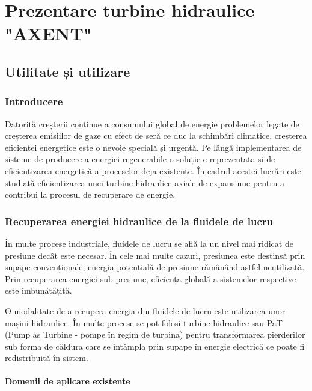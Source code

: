 \chapter{Prezentare turbine hidraulice "AXENT"}\label{chapter:prezentare}


\section{Utilitate și utilizare}

\subsection{Introducere}

Datorită creșterii continue a consumului global de energie problemelor legate de creșterea emisiilor de gaze cu efect de seră ce duc la schimbări climatice, creșterea eficienței energetice este o nevoie specială  și urgentă. Pe lângă implementarea de sisteme de producere a energiei regenerabile o soluție e reprezentata și de eficientizarea energetică a proceselor deja existente. În cadrul acestei lucrări este studiată eficientizarea unei turbine hidraulice axiale de expansiune pentru a contribui la procesul de recuperare de energie.


\subsection{Recuperarea energiei hidraulice de la fluidele de lucru}

În multe procese industriale, fluidele de lucru se află la un nivel mai ridicat de presiune decât este necesar. În cele mai multe cazuri, presiunea este destinsă prin supape convenționale, energia potențială de presiune rămânând astfel neutilizată. Prin recuperarea energiei sub presiune, eficiența globală a sistemelor respective este îmbunătățită.

O modalitate de a recupera energia din fluidele de lucru este utilizarea unor mașini hidraulice. În multe procese se pot folosi turbine hidraulice sau PaT \cite{renzi2019installation} (Pump as Turbine - pompe în regim de turbina) pentru transformarea pierderilor sub forma de căldura care se întâmpla prin supape în energie electrică ce poate fi redistribuită în sistem.


\subsubsection{Domenii de aplicare existente}

